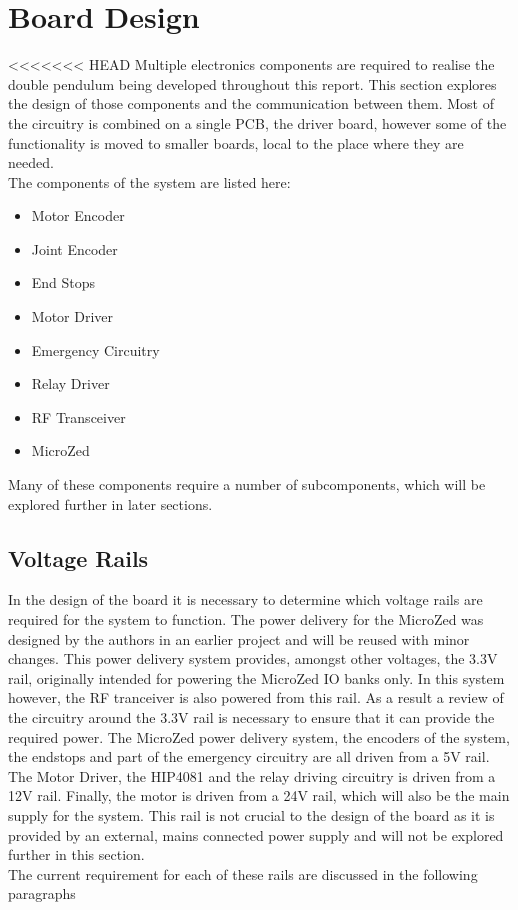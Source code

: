 \section{Board Design} %
\label{sec:board_design}
<<<<<<< HEAD
Multiple electronics components are required to realise the double pendulum being developed throughout this report.
This section explores the design of those components and the communication between them.
Most of the circuitry is combined on a single PCB, the driver board, however some of the functionality is moved to smaller boards, local to the place where they are needed.\\

The components of the system are listed here:
\begin{itemize}
	\item Motor Encoder
	\item Joint Encoder
	\item End Stops
	\item Motor Driver
	\item Emergency Circuitry
	\item Relay Driver
	\item RF Transceiver
	\item MicroZed 
\end{itemize}
Many of these components require a number of subcomponents, which will be explored further in later sections.

\subsection{Voltage Rails} %
\label{sub:voltage_rails}
In the design of the board it is necessary to determine which voltage rails are required for the system to function.
The power delivery for the MicroZed was designed by the authors in an earlier project \cite{isaswarm} and will be reused with minor changes.
This power delivery system provides, amongst other voltages, the 3.3V rail, originally intended for powering the MicroZed IO banks only.
In this system however, the RF tranceiver is also powered from this rail.
As a result a review of the circuitry around the 3.3V rail is necessary to ensure that it can provide the required power.
The MicroZed power delivery system, the encoders of the system, the endstops and part of the emergency circuitry are all driven from a 5V rail.
The Motor Driver, the HIP4081 \cite{driver} and the relay driving circuitry is driven from a 12V rail.
Finally, the motor is driven from a 24V rail, which will also be the main supply for the system.
This rail is not crucial to the design of the board as it is provided by an external, mains connected power supply and will not be explored further in this section.\\
The current requirement for each of these rails are discussed in the following paragraphs

